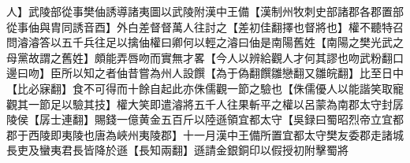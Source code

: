 人】武陵部從事樊伷誘導諸夷圖以武陵附漢中王備【漢制州牧刺史部諸郡各郡置部從事伷與胄同誘音酉】外白差督督萬人往討之【差初佳翻擇也督將也】權不聽特召問濬濬答以五千兵往足以擒伷權曰卿何以輕之濬曰伷是南陽舊姓【南陽之樊光武之母黨故謂之舊姓】頗能弄唇吻而實無才畧【今人以辨給觀人才何其謬也吻武粉翻口邊曰吻】臣所以知之者伷昔嘗為州人設饌【為于偽翻饌雛戀翻又雛皖翻】比至日中【比必寐翻】食不可得而十餘自起此亦侏儒觀一節之驗也【侏儒優人以能諧笑取寵觀其一節足以驗其技】權大笑即遣濬將五千人往果斬平之權以呂蒙為南郡太守封孱陵侯【孱士連翻】賜錢一億黄金五百斤以陸遜領宜都太守【吳録曰蜀昭烈帝立宜都郡于西陵即夷陵也唐為峽州夷陵郡】十一月漢中王備所置宜都太守樊友委郡走諸城長吏及蠻夷君長皆降於遜【長知兩翻】遜請金銀銅印以假授初附擊蜀將